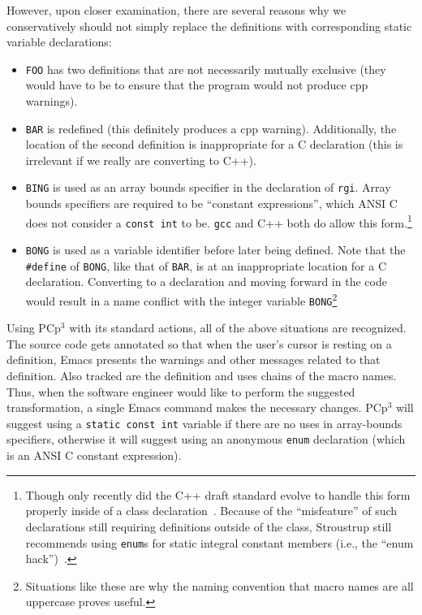 \documentclass{article}
\newcommand{\pcp}{\mbox{\textsf{PCp}$^3$}}
\newcommand{\Cpp}{\mbox{\textsf{cpp}}}
\newcommand{\CPP}{\mbox{\textsf{C++}}}
\newcommand{\C}{\mbox{\textsf{C}}}
\newcommand{\ppd}[1]{\texttt{\##1}}
\newcommand{\ie}{i.e.,}
\begin{document}
However, upon closer examination, there are several reasons why we
conservatively should not simply replace the definitions with
corresponding static variable declarations:

\begin{itemize}
\item \texttt{FOO} has two definitions that are not necessarily mutually
      exclusive (they would have to be to ensure that the program would
      not produce \Cpp{} warnings).
\item \texttt{BAR} is redefined (this definitely produces a \Cpp{}
      warning).  Additionally, the location of the second definition is
      inappropriate for a \C{} declaration (this is irrelevant if we
      really are converting to \CPP{}).
\item \texttt{BING} is used as an array bounds specifier in the
      declaration of \texttt{rgi}.  Array bounds specifiers are required
      to be ``constant expressions'', which ANSI \C{} does not consider
      a \texttt{const int} to be.  \texttt{gcc} and \CPP{} both do allow
      this form.\footnote{Though only recently did the \CPP{} draft standard
      evolve to handle this form properly inside of a class
      declaration~\cite{CD2DraftStandard}.  Because of the
      ``misfeature'' of such declarations still requiring definitions
      outside of the class, Stroustrup still recommends using
      \texttt{enum}s for static integral constant members (\ie{} the
      ``enum hack'')~\cite[p.~249]{Stroustrup97}.}
\item \texttt{BONG} is used as a variable identifier before later being
      defined.  Note that the \ppd{define} of \texttt{BONG}, like that
      of \texttt{BAR}, is at an inappropriate location for a \C{}
      declaration.  Converting to a declaration and moving forward in
      the code would result in a name conflict with the integer variable
      \texttt{BONG}\footnote{Situations like these are why the naming
      convention that macro names are all uppercase proves useful.}
\end{itemize}

\noindent Using \pcp{} with its standard actions, all of the above
situations are recognized.  The source code gets annotated so that when
the user's cursor is resting on a definition, Emacs presents the
warnings and other messages related to that definition.  Also tracked
are the definition and uses chains of the macro names.  Thus, when the
software engineer would like to perform the suggested transformation, a
single Emacs command makes the necessary changes.  \pcp{} will suggest
using a \texttt{static const int} variable if there are no uses in
array-bounds specifiers, otherwise it will suggest using an anonymous
\texttt{enum} declaration (which is an ANSI \C{} constant expression).
\end{document}
